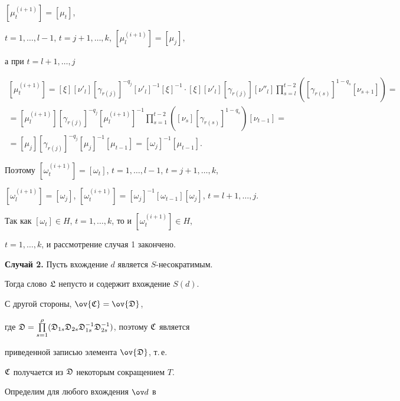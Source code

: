 $[\mu^{(i+1)}_t]=[\mu_t]$,


$t=1,\dotsc,l-1$, $t=j+1,\dotsc,k$, $[\mu^{(i+1)}_l]=[\mu_j]$,


а при $t=l+1,\dotsc,j$


\begin{gather*}


[\mu^{(i+1)}_t]=[\xi][\nu'_l][\gamma_{r(j)}]^{-q_j}


[\nu'_l]^{-1}[\xi]^{-1}\cdot[\xi][\nu'_l][\gamma_{r(j)}]


[\nu''_l]\prod^{t- 2}_{s=l}([\gamma_{r(s)}]^{1-q_s}[\nu_{s+1}])= \\


%


=[\mu^{(i+1)}_l][\gamma_{r(j)}]^{-q_j}[\mu^{(i+1)}_l]^{-1}


\prod^{t- 2}_{s=1}([\nu_s][\gamma_{r(s)}]^{1-q_s})[\nu_{{t-1}}]=\\


=[\mu_j][\gamma_{r(j)}]^{-q_j}[\mu_j]^{-1}[\mu_{{t-1}}]=


[\omega_j]^{-1}[\mu_{t-1}].


\end{gather*}


Поэтому $[\omega^{(i+1)}_t]=[\omega_t]$, $t=1,\dotsc,l-1$, $t=j+1,\dotsc,k$,


$[\omega^{(i+1)}_l]=[\omega_j]$, $[\omega^{(i+1)}_t]=


[\omega_j]^{-1}[\omega_{t-1}][\omega_j]$, $t=l+1,\dotsc,j$.


Так как $[\omega_t]\in H$, $t=1,\dotsc,k$, то и $[\omega^{(i+1)}_t]\in H$, 


$t=1,\dotsc,k$, и рассмотрение случая 1 закончено.


\medskip





{\bf Случай 2.} Пусть вхождение $d$ является $S$-несократимым.


Тогда слово $\frak L$ непусто и содержит вхождение $S(d)$.


С другой стороны, $\ov{\frak C}=\ov{\frak D}$,


где $\frak D=\PL_{s=1}^\rho(\frak D_{1s} \frak D_{2s}


\frak D^{-1}_{1s} \frak D^{-1}_{2s})$, поэтому $\frak C$ является


приведенной записью элемента $\ov{\frak D}$, т.\,е.


$\frak C$ получается из $\frak D$ некоторым сокращением $T$. 


Определим для любого вхождения $\ov d$ в


